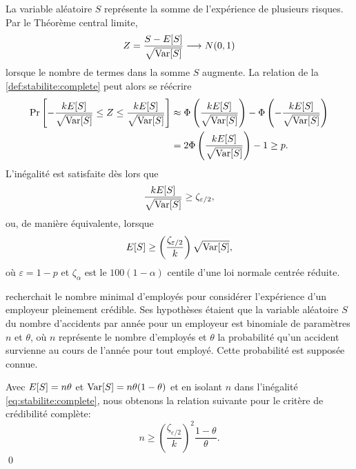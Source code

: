 La variable aléatoire $S$ représente la somme de l'expérience de
plusieurs risques. Par le Théorème central limite,
\begin{equation*}
  Z = \frac{S - E [ S ]}{\sqrt{\operatorname{Var} [ S ]}}
  \longrightarrow
  N(0, 1)
\end{equation*}
lorsque le nombre de termes dans la somme $S$ augmente. La relation de
la \autoref{def:stabilite:complete} peut alors se réécrire
\begin{align*}
  \Pr
  \left[
    - \frac{k E [ S ]}{\sqrt{\operatorname{Var} [ S ]}}
    \leq Z \leq
    \frac{k E [ S ]}{\sqrt{\operatorname{Var} [ S ]}}
  \right]
  &\approx
    \Phi
    \left(
      \frac{k E [ S ]}{\sqrt{\operatorname{Var} [ S ]}}
    \right) -
    \Phi
    \left(
      - \frac{k E [ S ]}{\sqrt{\operatorname{Var} [ S ]}}
    \right) \\
  &=
    2 \Phi
    \left(
    \frac{k E [ S ]}{\sqrt{\operatorname{Var} [ S ]}}
    \right) - 1 \geq p.
\end{align*}
L'inégalité est satisfaite dès lors que
\begin{equation*}
  \frac{k E [ S ]}{\sqrt{\operatorname{Var} [ S ]}} \geq \zeta_{\varepsilon/2},
\end{equation*}
ou, de manière équivalente, lorsque
\begin{equation}
  \label{eq:stabilite:complete}
  E [ S ] \geq
  \left(
    \frac{\zeta_{\varepsilon/2}}{k}
  \right)
  \sqrt{\operatorname{Var} [ S ]},
\end{equation}
où $\varepsilon = 1 - p$ et $\zeta_\alpha$ est le $100(1 -
\alpha)${\ieme} centile d'une loi normale centrée réduite.

\begin{exemple}
  \label{exemple:stabilite:binomiale_pure}
  \citet{Mowbray:1914} recherchait le nombre minimal d'employés pour
  considérer l'expérience d'un employeur pleinement crédible. Ses
  hypothèses étaient que la variable aléatoire $S$ du nombre
  d'accidents par année pour un employeur est binomiale de paramètres
  $n$ et $\theta$, où $n$ représente le nombre d'employés et $\theta$
  la probabilité qu'un accident survienne au cours de l'année pour
  tout employé. Cette probabilité est supposée connue.

  Avec $E [ S ] = n \theta$ et $\operatorname{Var} [ S ] = n \theta (1 - \theta)$ et en
  isolant $n$ dans l'inégalité \eqref{eq:stabilite:complete}, nous
  obtenons la relation suivante pour le critère de crédibilité
  complète:
  \begin{equation*}
    n \geq
    \left(
      \frac{\zeta_{\varepsilon/2}}{k}
    \right)^2
    \frac{1 - \theta}{\theta}.
  \end{equation*}
  \qed
\end{exemple}

